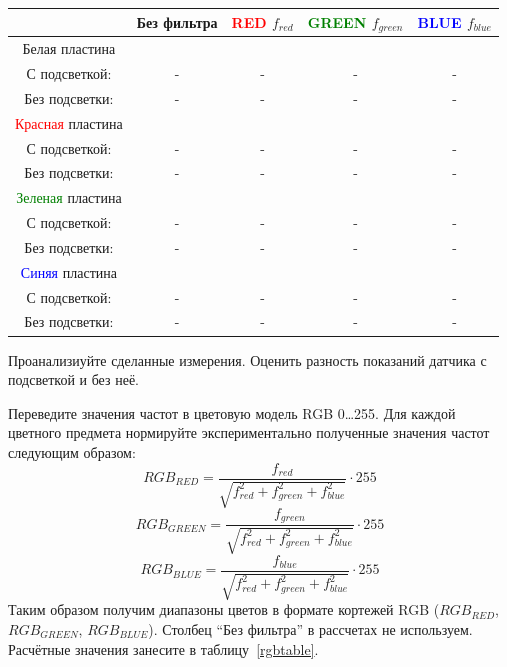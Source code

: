\documentclass[12pt]{article}
\begin{document}
\begin{table}[H]
    \centering
    \caption{Экспериментальные измерения частоты \(f_o\), Гц}\label{exper}
    \begin{longtable}[]{c|c|c|c|c}
        \toprule
          & Без фильтра & \textcolor{red}{RED} \(f_{red}\) & \textcolor{green}{GREEN} \(f_{green}\) & \textcolor{blue}{BLUE} \(f_{blue}\) \\
        \midrule
        Белая пластина &  &  &  &  \\
        \hline
        С подсветкой: & - & - & - & - \\
        Без подсветки: & - & - & - & - \\
        \hline
        \textcolor{red}{Красная} пластина &  &  &  &  \\
        \hline
        С подсветкой: & - & - & - & - \\
        Без подсветки: & - & - & - & - \\
        \hline
        \textcolor{green}{Зеленая} пластина &  &  &  &  \\
        \hline
        С подсветкой: & - & - & - & - \\
        Без подсветки: & - & - & - & - \\
        \hline
        \textcolor{blue}{Синяя} пластина &  &  &  &  \\
        \hline
        С подсветкой: & - & - & - & - \\
        Без подсветки: & - & - & - & - \\
        \bottomrule
    \end{longtable}
\end{table}

Проанализиуйте сделанные измерения. Оценить разность показаний датчика с подсветкой и без неё.

Переведите значения частот в цветовую модель RGB 0\dots255. Для каждой цветного предмета нормируйте экспериментально полученные значения частот следующим образом:
\[RGB_{RED}=\frac{f_{red}}{\sqrt{f_{red}^2+f_{green}^2+f_{blue}^2}}\cdot255\]
\[RGB_{GREEN}=\frac{f_{green}}{\sqrt{f_{red}^2+f_{green}^2+f_{blue}^2}}\cdot255\]
\[RGB_{BLUE}=\frac{f_{blue}}{\sqrt{f_{red}^2+f_{green}^2+f_{blue}^2}}\cdot255\]
Таким образом получим диапазоны цветов в формате кортежей RGB (\(RGB_{RED}\), \(RGB_{GREEN}\), \(RGB_{BLUE}\)). Столбец ``Без фильтра'' в рассчетах не используем. Расчётные значения занесите в таблицу~\ref{rgbtable}.
\end{document}
